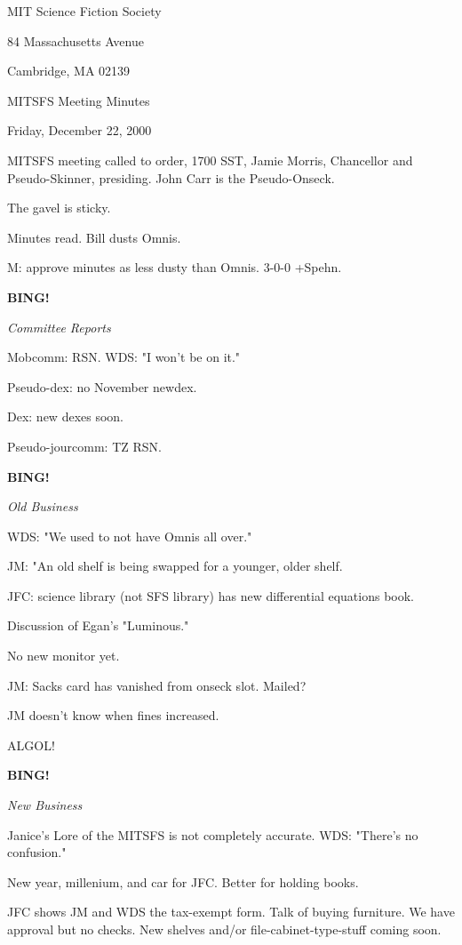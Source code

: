 \documentclass[12pt]{article}
\newcommand{\bing}{{\bf BING!} }
\newcommand{\goto}[1]{\bing \vskip 12pt \centerline{{\em{#1}}}}
\begin{document}
\begin{center}

MIT Science Fiction Society 

84 Massachusetts Avenue

Cambridge, MA 02139

\vspace{12pt}

MITSFS Meeting Minutes 

Friday, December 22, 2000

\end{center}
 
\vspace{18pt}

\setlength{\parskip}{6pt}

\noindent
MITSFS meeting called to order, 1700 SST, Jamie Morris, Chancellor and Pseudo-Skinner, presiding.  John Carr is the Pseudo-Onseck.

The gavel is sticky.

Minutes read. Bill dusts Omnis.

M: approve minutes as less dusty than Omnis. 3-0-0 +Spehn.

\goto{Committee Reports}

Mobcomm: RSN. WDS: "I won't be on it."

Pseudo-dex: no November newdex.

Dex: new dexes soon.

Pseudo-jourcomm: TZ RSN.

\goto{Old Business}

WDS: "We used to not have Omnis all over."

JM: "An old shelf is being swapped for a younger, older shelf.

JFC: science library (not SFS library) has new differential equations book.

Discussion of Egan's "Luminous."

No new monitor yet.

JM: Sacks card has vanished from onseck slot. Mailed?

JM doesn't know when fines increased.

ALGOL!

\goto{New Business}

Janice's Lore of the MITSFS is not completely accurate. WDS: "There's no confusion."

New year, millenium, and car for JFC. Better for holding books.

JFC shows JM and WDS the tax-exempt form. Talk of buying furniture. We have approval but no checks. New shelves and/or file-cabinet-type-stuff coming soon.
\end{document}
